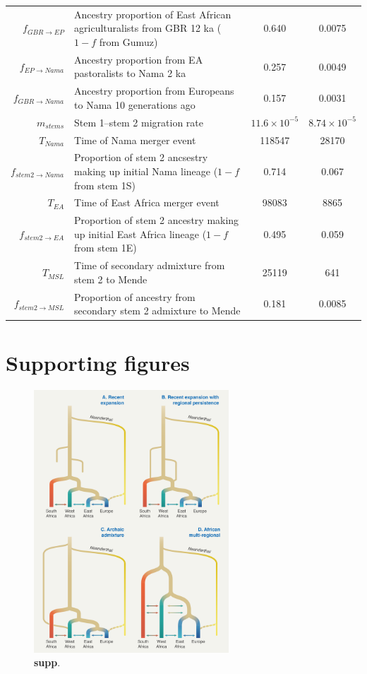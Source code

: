 \documentclass[]{article}
\begin{document}
\begin{table}[ht]
\begin{tabular}[t]{rP{8cm}cc}
    $f_{GBR \rightarrow EP}$ & Ancestry proportion of East African agriculturalists from GBR 12 ka ($1-f$ from Gumuz) & 0.640 & 0.0075 \\
    $f_{EP \rightarrow Nama}$ & Ancestry proportion from EA pastoralists to Nama 2 ka & 0.257 & 0.0049 \\
    $f_{GBR \rightarrow Nama}$ & Ancestry proportion from Europeans to Nama 10 generations ago & 0.157 & 0.0031 \\
    $m_{stems}$ & Stem 1--stem 2 migration rate & $11.6\times10^{-5}$ & $8.74\times10^{-5}$ \\
    $T_{Nama}$ & Time of Nama merger event & 118547 & 28170 \\
    $f_{stem 2 \rightarrow Nama}$ & Proportion of stem 2 ancsestry making up initial Nama lineage ($1-f$ from stem 1S) & 0.714 & 0.067 \\
    $T_{EA}$ & Time of East Africa merger event & 98083 & 8865 \\
    $f_{stem 2 \rightarrow EA}$ & Proportion of stem 2 ancestry making up initial East Africa lineage ($1-f$ from stem 1E) & 0.495 & 0.059 \\
    $T_{MSL}$ & Time of secondary admixture from stem 2 to Mende & 25119 & 641 \\
    $f_{stem 2 \rightarrow MSL}$ & Proportion of ancestry from secondary stem 2 admixture to Mende & 0.181 & 0.0085 \\
    \bottomrule
\end{tabular}
\end{table}

\clearpage

\section*{Supporting figures}

\begin{figure}[ht]
\begin{center}
    \includegraphics[width=0.65\textwidth]{figures/supp-possible-models.png}
    \caption{\textbf{supp}.}
    \label{fig:supp-possible-models}
\end{center}
\end{figure}
\end{document}

